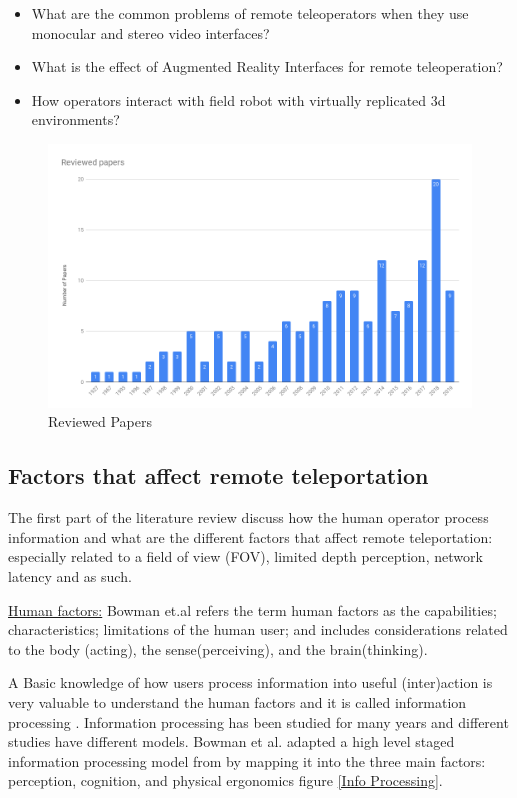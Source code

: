 \begin{itemize}
    \item What are the common problems of remote teleoperators when they use monocular and stereo video interfaces?
    \item What is the effect of Augmented Reality Interfaces for remote teleoperation?
    \item How operators interact with field robot with virtually replicated 3d environments?
\end{itemize}

\begin{figure}
     \includegraphics[width=1\textwidth]{images/Reviewed_papers.png}
    \caption{Reviewed Papers}
    \centering
    \label{Reviewed Papers}
\end{figure}

\subsection{Factors that affect remote teleportation}

The first part of the literature review discuss how the human operator process information and what are the different factors that affect remote teleportation: especially related to a field of view (FOV), limited depth perception, network latency and as such.

\underline{Human factors:} Bowman et.al  \cite{Bowman:2004:UIT:993837} refers the term human factors as the capabilities; characteristics; limitations of the human user; and includes considerations related to the body (acting), the sense(perceiving), and the brain(thinking).

A Basic knowledge of how users process information into useful (inter)action is very valuable to understand the human factors and it is called information processing \cite{Bowman:2004:UIT:993837}. Information processing has been studied for many years and different studies have different models. Bowman et al. \cite{Bowman:2004:UIT:993837} adapted a high level staged information processing model from \cite{PMID:11540969} by mapping it into the three main factors: perception, cognition, and physical ergonomics figure \ref{Info Processing}.

